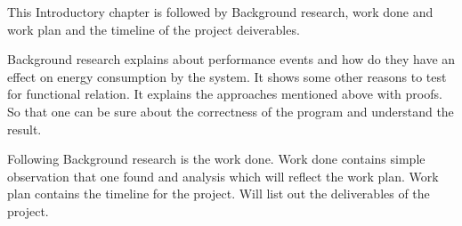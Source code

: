 This Introductory chapter is followed by Background research, work done and work plan and the timeline of the project deiverables.

Background research explains about performance events and how do they have an effect on energy consumption by the system. It shows some other reasons to test for functional relation. It explains the approaches mentioned above with proofs. So that one can be sure about the correctness of the program and understand the result. 

Following Background research is the work done. Work done contains simple observation that one found and analysis which will reflect the work plan. Work plan contains the timeline for the project. Will list out the deliverables of the project.